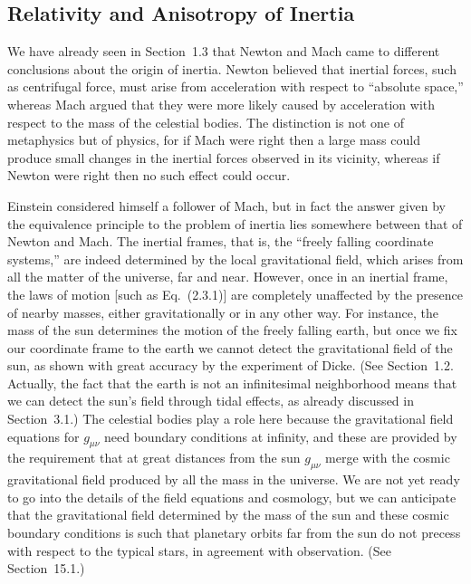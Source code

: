 
\subsection{Relativity and Anisotropy of Inertia}\label{sec:3.7}

We have already seen in Section~1.3 that Newton and Mach came to different
conclusions about the origin of inertia. Newton believed that inertial
forces, such as centrifugal force, must arise from acceleration with respect
to ``absolute space,'' whereas Mach argued that they were more likely caused
by acceleration with respect to the mass of the celestial bodies. The
distinction is not one of metaphysics but of physics, for if Mach were right
then a large mass could produce small changes in the inertial forces observed
in its vicinity, whereas if Newton were right then no such effect could
occur.

Einstein considered himself a follower of Mach, but in fact the answer given
by the equivalence principle to the problem of inertia lies somewhere between
that of Newton and Mach. The inertial frames, that is, the ``freely falling
coordinate systems,'' are indeed determined by the local gravitational
field, which arises from all the matter of the universe, far and near.
However, once in an inertial frame, the laws of motion [such as
Eq.~(2.3.1)] are completely unaffected by the presence of nearby masses,
either gravitationally or in any other way. For instance, the mass of the
sun determines the motion of the freely falling earth, but once we fix our
coordinate frame to the earth we cannot detect the gravitational field of
the sun, as shown with great accuracy by the experiment of Dicke. (See
Section~1.2. Actually, the fact that the earth is not an infinitesimal
neighborhood means that we can detect the sun's field through tidal effects,
as already discussed in Section~3.1.) The celestial bodies play a role here
because the gravitational field equations for $g_{\mu\nu}$ need boundary
conditions at infinity, and these are provided by the requirement that at
great distances from the sun $g_{\mu\nu}$ merge with the cosmic
gravitational field produced by all the mass in the universe. We are not yet
ready to go into the details of the field equations and cosmology, but we can
anticipate that the gravitational field determined by the mass of the sun
and these cosmic boundary conditions is such that planetary orbits far from
the sun do not precess with respect to the typical stars, in agreement with
observation. (See Section~15.1.)

